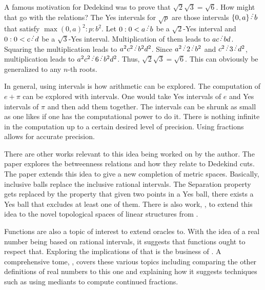 \documentclass[12pt]{article}
\begin{document}
A famous motivation for Dedekind was to prove that $\sqrt{2} \sqrt{3} = \sqrt{6}$. How might that go with the relations? The Yes intervals for $\sqrt{p}$ are those intervals $\{0, a\} \lte b$ that satisfy $\max(0,a)^2 : p : b^2$. Let $0:0 < a \lte b$ be a $\sqrt{2}$-Yes interval and $0:0 < c\lte d$ be a $\sqrt{3}$-Yes interval. Multiplication of them leads to $ac \lte bd$. Squaring the multiplication leads to $a^2 c^2 \lte b^2 d^2$. Since $a^2 \lte 2 \lte b^2$ and $c^2 \lte 3 \lte d^2$, multiplication leads to $a^2 c^2 \lte 6 \lte b^2 d^2$. Thus, $\sqrt{2} \sqrt{3} = \sqrt{6}$. This can obviously be generalized to any $n$-th roots. 

In general, using intervals is how arithmetic can be explored. The computation of $e + \pi$ can be explored with intervals. One would take Yes intervals of $e$ and Yes intervals of $\pi$ and then add them together. The intervals can be shrunk as small as one likes if one has the computational power to do it. There is nothing infinite in the computation up to a certain desired level of precision. Using fractions allows for accurate precision. 

There are other works relevant to this idea being worked on by the author. The paper \cite{taylor24dedekind} explores the betweenness relations and how they relate to Dedekind cuts. The paper \cite{taylor23metric} extends this idea to give a new completion of metric spaces. Basically, inclusive balls replace the inclusive rational intervals. The Separation property gets replaced by the property that given two points in a Yes ball, there exists a Yes ball that excludes at least one of them. There is also work, \cite{taylor23maudlin}, to extend this idea to the novel topological spaces of linear structures from \cite{maudlin}. 

Functions are also a topic of interest to extend oracles to. With the idea of a real number being based on rational intervals, it suggests that functions ought to respect that. Exploring the implications of that is the business of \cite{taylor23funora}. A comprehensive tome, \cite{taylor23main}, covers these various topics including comparing the other definitions of real numbers to this one and explaining how it suggests techniques such as using mediants to compute continued fractions. 

\medskip

\normalem %

\printbibliography
\end{document}

